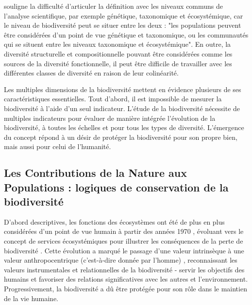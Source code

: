 \cite{mouysset_diversity_2023} souligne la difficulté d'articuler la définition avec les niveaux communs de l'analyse scientifique, par exemple génétique, taxonomique et écosystémique, car le niveau de biodiversité peut se situer entre les deux : "les populations peuvent être considérées d'un point de vue génétique et taxonomique, ou les communautés qui se situent entre les niveaux taxonomique et écosystémique". En outre, la diversité structurelle et compositionnelle pouvant être considérées comme les sources de la diversité fonctionnelle, il peut être difficile de travailler avec les différentes classes de diversité en raison de leur colinéarité. 

Les multiples dimensions de la biodiversité mettent en évidence plusieurs de ses caractéristiques essentielles. Tout d'abord, il est impossible de mesurer la biodiversité à l'aide d'un seul indicateur. L'étude de la biodiversité nécessite de multiples indicateurs pour évaluer de manière intégrée l'évolution de la biodiversité, à toutes les échelles et pour tous les types de diversité. L'émergence du concept répond à un désir de protéger la biodiversité pour son propre bien, mais aussi pour celui de l'humanité. 


{}
\subsection*{Les Contributions de la Nature aux Populations : logiques de conservation de la biodiversité}

D'abord descriptives, les fonctions des écosystèmes ont été de plus en plus considérées d'un point de vue humain à partir des années 1970 \citep{hueting1969functions, schumacher1973small}, évoluant vers le concept de services écosystémiques \citep{ehrlich1981extinction} pour illustrer les conséquences de la perte de biodiversité \citep{gomez_history_2010}. Cette évolution a marqué le passage d'une valeur intrinsèque à une valeur anthropocentrique (c'est-à-dire donnée par l'homme) \citep{mouysset_diversity_2023}, reconnaissant les valeurs instrumentales et relationnelles de la biodiversité - servir les objectifs des humains et favoriser des relations significatives avec les autres et l'environnement. Progressivement, la biodiversité a dû être protégée pour son rôle dans le maintien de la vie humaine.

